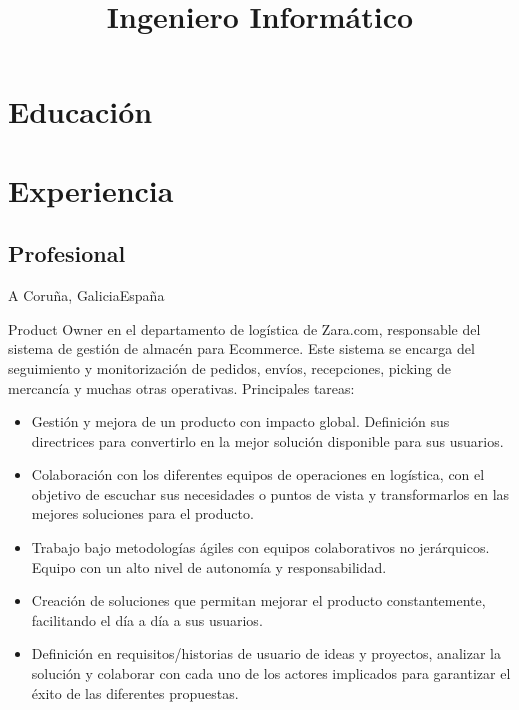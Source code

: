 \documentclass[11pt,a4paper,sans]{moderncv}        %
\title{Ingeniero Informático}
\begin{document}
\makecvtitle

\section{Educación}

\section{Experiencia}
\subsection{Profesional}
 {A Coru\~{n}a, Galicia}{Espa\~{n}a}{
Product Owner en el departamento de logística de Zara.com, responsable del sistema de gestión de almacén para Ecommerce. Este sistema se encarga del seguimiento y monitorización de pedidos, envíos, recepciones, picking de mercancía y muchas otras operativas. Principales tareas:
\begin{itemize}%
\item Gestión y mejora de un producto con impacto global. Definición sus directrices para convertirlo en la mejor solución disponible para sus usuarios.
\item Colaboración con los diferentes equipos de operaciones en logística, con el objetivo de escuchar sus necesidades o puntos de vista y transformarlos en las mejores soluciones para el producto.
\item Trabajo bajo metodologías ágiles con equipos colaborativos no jerárquicos. Equipo con un alto nivel de autonomía y responsabilidad.
\item Creación de soluciones que permitan mejorar el producto constantemente, facilitando el día a día a sus usuarios.
\item Definición en requisitos/historias de usuario de ideas y proyectos, analizar la solución y colaborar con cada uno de los actores implicados para garantizar el éxito de las diferentes propuestas.
\end{itemize}}
\end{document}
